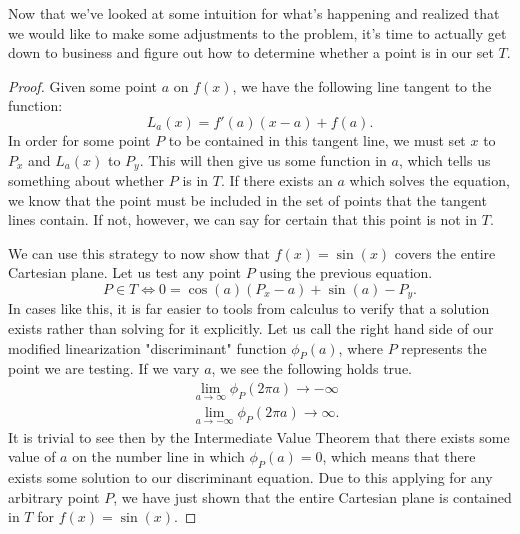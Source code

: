 Now that we've looked at some intuition for what's happening and realized that
we would like to make some adjustments to the problem, it's time to actually
get down to business and figure out how to determine whether a point is in our
set \( T \).

\begin{proof}
Given  some point \( a \) on \( f \left( x \right) \), we have the following line tangent to the function:
\[
    L_a \left( x \right) = f' \left( a \right) \left( x - a \right) + f \left( a \right)
.\]
In order for some point \( P \) to be contained in this tangent line, we must
set \( x \) to \( P_x \) 
and \( L_a \left( x \right) \) to \( P_y \). This will then give us some
function in \( a \), which tells us something about whether \( P \) is in \( T
\). If there exists an \( a \) which solves the equation, we know that the
point must be included in the set of points that the tangent lines contain. If
not, however, we can say for certain that this point is not in \( T \).

We can use this strategy to now show that \( f \left( x \right) = \sin{\left( x
\right)} \) covers the entire Cartesian plane. Let us test any point \( P \)
using the previous equation.
\[
    P \in T \iff 0 = \cos{\left( a \right)} \left( P_x - a \right) + \sin{\left( a \right)} - P_y
.\]
In cases like this, it is far easier to tools from calculus to verify that a
solution exists rather than solving for it explicitly. Let us call the right
hand side of our modified linearization "discriminant" function  \( \phi_P \left( a \right) \),
where \( P \) represents the point we are testing. If we
vary \( a \), we see the following holds true.
\begin{align*}
    & \lim_{a \to \infty} \phi_P \left( 2 \pi a \right) \to -\infty \\
    & \lim_{a \to -\infty} \phi_P \left( 2 \pi a \right) \to \infty
.\end{align*}
It is trivial to see then by the Intermediate Value Theorem that there exists
some value of \( a \) on the number line in which \( \phi_P \left( a \right) = 0 \), which means
that there exists some solution to our discriminant equation. Due to this applying
for any arbitrary point \( P \), we have just shown that the entire Cartesian plane is
contained in \( T \) for \( f \left( x \right) = \sin{\left( x \right)} \).
\end{proof}

